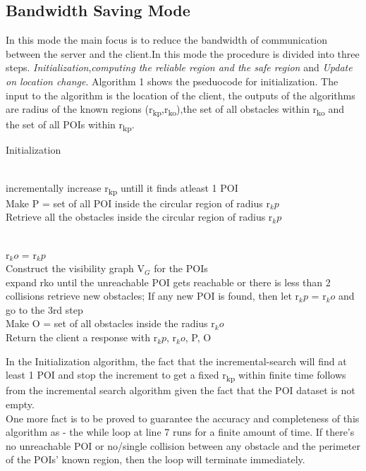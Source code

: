 \documentclass{sig-alternate}
\begin{document}
\subsection{Bandwidth Saving Mode}
In this mode the main focus is to reduce the bandwidth of communication between the server and the client.In this mode the procedure is divided into three steps. \textit{Initialization},\textit{computing the reliable region and the safe region} and \textit{Update on location change}. Algorithm 1 shows the pseduocode for initialization. The input to the algorithm is the location of the client, the outputs of the algorithms are radius of the known regions (r\textsubscript{kp},r\textsubscript{ko}),the set of all obstacles within r\textsubscript{ko} and the set of all POIs within r\textsubscript{kp}.
\begin{algorithm}
\caption{Initialization}
\label{Init}
\begin{algorithmic}[1]
\\incrementally increase r\textsubscript{kp} untill it finds atleast 1 POI
\\Make P = {set of all POI inside the circular region of radius r$_kp$}
\\Retrieve all the obstacles inside the circular region of radius r$_kp$

\\r$_ko$ = r$_kp$
\\Construct the visibility graph V$_G$ for the POIs
\\ 
\State expand rko  until the unreachable POI gets reachable or there is less than 2 collisions
\State retrieve new obstacles;
\State If any new POI is found, then let r$_kp$ = r$_ko$ and go to the 3rd step
\EndWhile
\\Make O = {set of all obstacles inside the radius r$_ko$}
\\Return the client a response with  r$_kp$, r$_ko$, P, O 


\EndProcedure
\end{algorithmic}
\end{algorithm}

In the Initialization algorithm, the fact that the incremental-search will find at least 1 POI and stop the increment to get a fixed r\textsubscript{kp} within finite time follows from the incremental search algorithm given the fact that the POI dataset is not empty.
\\One more fact is to be proved to guarantee the accuracy and completeness of this algorithm as - the while loop at line 7 runs for a finite amount of time.
 If there’s no unreachable POI or no/single collision between any obstacle and the perimeter of the POIs’ known region, then the loop will terminate immediately.
\end{document}
